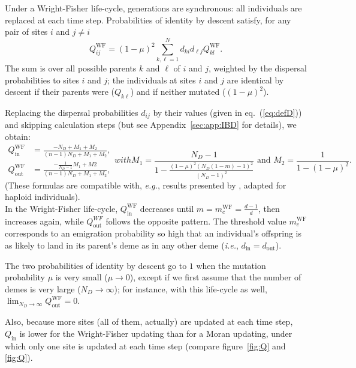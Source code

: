 \documentclass[11pt, letterpaper]{article}
\renewcommand{\eqref}[1]{\textup{{\normalfont eq.~(\ref{#1}}\normalfont)}}
\newcommand{\ie}{\textit{i.e.}}
\newcommand{\eg}{\textit{e.g.}}
\newcommand{\appname}[0]{Appendix}
\newcommand{\WF}{\textrm{WF}}
\newcommand{\inn}{\textrm{in}}
\newcommand{\out}{\textrm{out}}
\newcommand{\din}{d_{\inn}}
\newcommand{\dout}{d_{\out}}
\newcommand{\Qin}{Q_{\inn}}
\newcommand{\Qout}{Q_{\out}}
\newcommand{\ndemes}{N_D}
\begin{document}
Under a Wright-Fisher life-cycle, generations are synchronous: all individuals are replaced at each time step. Probabilities of identity by descent satisfy, for any pair of sites $i$ and $j \neq i$
\begin{equation}
Q_{ij}^{\WF} = (1-\mu)^2 \sum_{k,\ell = 1}^N d_{ki} d_{\ell j} Q_{kl}^{\WF}.
\end{equation}
The sum is over all possible parents $k$ and $\ell$ of $i$ and $j$, weighted by the dispersal probabilities to sites $i$ and $j$; the individuals at sites $i$ and $j$ are identical by descent if their parents were ($Q_{k\ell}$) and if neither mutated ($(1-\mu)^2$). 

Replacing the dispersal probabilities $d_{ij}$ by their values (given in \eqref{eq:defD}) and skipping calculation steps (but see \appname~\ref{sec:app:IBD} for details), we obtain:
%
\begin{subequations}\label{eq:QWF}
\begin{align}
\Qin^{\WF} &= \frac{-\ndemes + M_1 + M_2}{(n-1) \ndemes +M_1 + M_2}, \\
\Qout^{\WF} & = \frac{-\frac{1}{\ndemes-1}M_1 + M2}{(n-1) \ndemes +M_1 + M_2},
\end{align}
with
\begin{equation*}
M_1 = \frac{\ndemes-1}{1-\frac{(1-\mu )^2 (\ndemes (1-m)-1)^2}{(\ndemes-1)^2}} \textrm{ and }M_2 = \frac{1}{1-(1-\mu)^2}.
\end{equation*}
\end{subequations}
%
(These formulas are compatible with, \eg, results presented by \citet{CockerhamWeir1987}, adapted for haploid individuals).\\
In the Wright-Fisher life-cycle, $\Qin^{\WF}$ decreases until $m=m_c^{\WF} = \frac{d-1}{d}$, then increases again, while $\Qout^{WF}$ follows the opposite pattern. The threshold value $m_c^{\WF}$ corresponds to an emigration probability so high that an individual's offspring is as likely to land in its parent's deme as in any other deme (\ie, $\din = \dout$).

The two probabilities of identity by descent go to $1$ when the mutation probability $\mu$ is very small ($\mu \to 0$), except if we first assume that the number of demes is very large ($\ndemes \to \infty$); for instance, with this life-cycle as well, $\lim_{\ndemes \to \infty} \Qout^{\WF} = 0$. 

Also, because more sites (all of them, actually) are updated at each time step, $\Qin$ is lower for the Wright-Fisher updating than for a Moran updating, under which only one site is updated at each time step (compare figure~\ref{fig:Q} and \ref{fig:Q}). 
\end{document}
